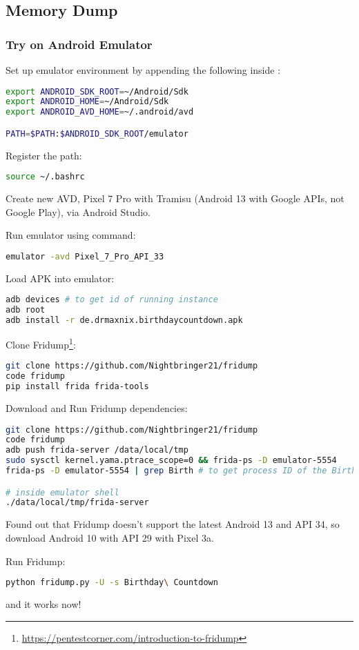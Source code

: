 \subsection{Memory Dump}
\label{task:20231121_memdump}

\subsubsection{Try on Android Emulator}

Set up emulator environment by appending the following inside :
\begin{lstlisting}[language=bash]
export ANDROID_SDK_ROOT=~/Android/Sdk
export ANDROID_HOME=~/Android/Sdk
export ANDROID_AVD_HOME=~/.android/avd

PATH=$PATH:$ANDROID_SDK_ROOT/emulator
\end{lstlisting}

Register the path: 
\begin{lstlisting}[language=bash]
source ~/.bashrc
\end{lstlisting}

Create new AVD, Pixel 7 Pro with Tramisu (Android 13 with Google APIs, not Google Play), via Android Studio.

Run emulator using command: 
\begin{lstlisting}[language=bash]
emulator -avd Pixel_7_Pro_API_33
\end{lstlisting}

Load APK into emulator: 
\begin{lstlisting}[language=bash]
adb devices # to get id of running instance
adb root
adb install -r de.drmaxnix.birthdaycountdown.apk
\end{lstlisting}

Clone Fridump\footnote{\url{https://pentestcorner.com/introduction-to-fridump}}:
\begin{lstlisting}[language=bash]
git clone https://github.com/Nightbringer21/fridump
code fridump
pip install frida frida-tools

\end{lstlisting}

Download and Run Fridump dependencies:
\begin{lstlisting}[language=bash]
git clone https://github.com/Nightbringer21/fridump
code fridump
adb push frida-server /data/local/tmp
sudo sysctl kernel.yama.ptrace_scope=0 && frida-ps -D emulator-5554
frida-ps -D emulator-5554 | grep Birth # to get process ID of the Birthday app

# inside emulator shell
./data/local/tmp/frida-server
\end{lstlisting}

Found out that Fridump doesn't support the latest Android 13 and API 34, so download Android 10 with API 29 with Pixel 3a.

Run Fridump:
\begin{lstlisting}[language=bash]
python fridump.py -U -s Birthday\ Countdown
\end{lstlisting}
and it works now!



